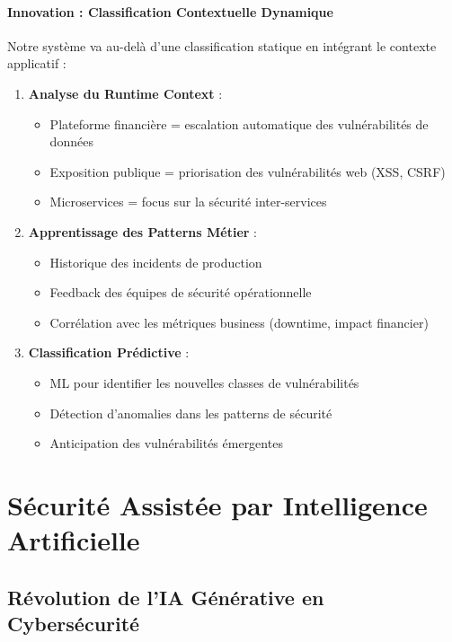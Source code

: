 \documentclass[12pt,a4paper]{report}
\begin{document}
\subsubsection{Innovation : Classification Contextuelle Dynamique}

Notre système va au-delà d'une classification statique en intégrant le contexte applicatif :

\begin{enumerate}
    \item \textbf{Analyse du Runtime Context} : 
    \begin{itemize}
        \item Plateforme financière = escalation automatique des vulnérabilités de données
        \item Exposition publique = priorisation des vulnérabilités web (XSS, CSRF)
        \item Microservices = focus sur la sécurité inter-services
    \end{itemize}

    \item \textbf{Apprentissage des Patterns Métier} :
    \begin{itemize}
        \item Historique des incidents de production
        \item Feedback des équipes de sécurité opérationnelle
        \item Corrélation avec les métriques business (downtime, impact financier)
    \end{itemize}

    \item \textbf{Classification Prédictive} :
    \begin{itemize}
        \item ML pour identifier les nouvelles classes de vulnérabilités
        \item Détection d'anomalies dans les patterns de sécurité
        \item Anticipation des vulnérabilités émergentes
    \end{itemize}
\end{enumerate}

\newpage

\chapter{Sécurité Assistée par Intelligence Artificielle}

\section{Révolution de l'IA Générative en Cybersécurité}
\end{document}
